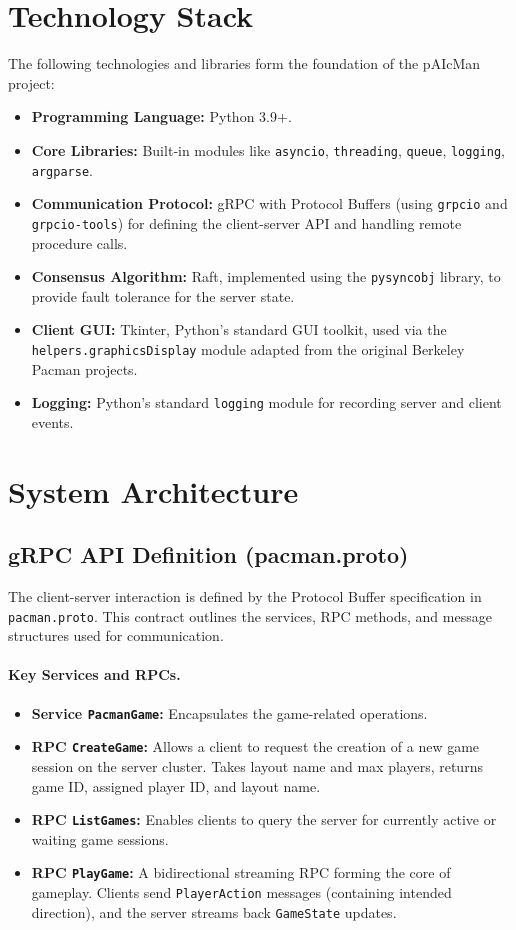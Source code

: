 \documentclass[11pt]{article}
\begin{document}
\section{Technology Stack}
The following technologies and libraries form the foundation of the pAIcMan project:
\begin{itemize}
  \item \textbf{Programming Language:} Python 3.9+.
  \item \textbf{Core Libraries:} Built‐in modules like \texttt{asyncio}, \texttt{threading}, \texttt{queue}, \texttt{logging}, \texttt{argparse}.
  \item \textbf{Communication Protocol:} gRPC with Protocol Buffers (using \texttt{grpcio} and \texttt{grpcio-tools}) for defining the client-server API and handling remote procedure calls.
  \item \textbf{Consensus Algorithm:} Raft, implemented using the \texttt{pysyncobj} library, to provide fault tolerance for the server state.
  \item \textbf{Client GUI:} Tkinter, Python's standard GUI toolkit, used via the \texttt{helpers.graphicsDisplay} module adapted from the original Berkeley Pacman projects.
  \item \textbf{Logging:} Python's standard \texttt{logging} module for recording server and client events.
\end{itemize}

\section{System Architecture}
\subsection{gRPC API Definition (pacman.proto)}
The client-server interaction is defined by the Protocol Buffer specification in \texttt{pacman.proto}. This contract outlines the services, RPC methods, and message structures used for communication.

\paragraph{Key Services and RPCs.}
\begin{itemize}
    \item \textbf{Service \texttt{PacmanGame}:} Encapsulates the game-related operations.
    \item \textbf{RPC \texttt{CreateGame}:} Allows a client to request the creation of a new game session on the server cluster. Takes layout name and max players, returns game ID, assigned player ID, and layout name.
    \item \textbf{RPC \texttt{ListGames}:} Enables clients to query the server for currently active or waiting game sessions.
    \item \textbf{RPC \texttt{PlayGame}:} A bidirectional streaming RPC forming the core of gameplay. Clients send \texttt{PlayerAction} messages (containing intended direction), and the server streams back \texttt{GameState} updates.
\end{itemize}
\end{document}
